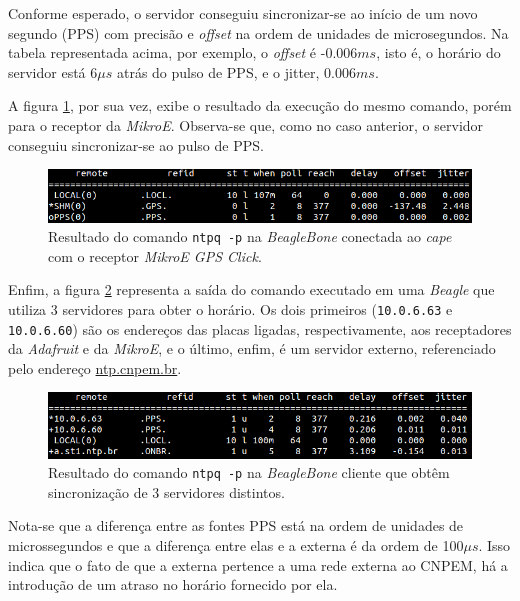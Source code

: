 \FloatBarrier

Conforme esperado, o servidor conseguiu sincronizar-se ao início de um novo
segundo (PPS) com precisão e \textit{offset} na ordem de unidades de
microsegundos. Na tabela representada acima, por exemplo, o \textit{offset} é
-0.006\(ms\), isto é, o horário do servidor está 6\(\mu s\) atrás do pulso de
PPS, e o jitter, 0.006\(ms\).

\vspace{12pt}

A figura \ref{img:mikroe}, por sua vez, exibe o resultado da execução do mesmo
comando, porém para o receptor da \textit{MikroE}. Observa-se que, como no caso
anterior, o servidor conseguiu sincronizar-se ao pulso de PPS.  

\FloatBarrier

\begin{figure}[h]
    
    \centering
    \includegraphics[scale=0.6]{image/mikroe}
    \caption {\centering Resultado do comando \texttt{ntpq -p} na
    \textit{BeagleBone} conectada ao \textit{cape} com o receptor
    \textit{MikroE GPS Click}.}
    \label{img:mikroe} 
\end{figure} 

\FloatBarrier

Enfim, a figura \ref{img:cliente_ntp} representa a saída do comando executado em
uma \textit{Beagle} que utiliza 3 servidores para obter o horário. Os dois
primeiros (\texttt{10.0.6.63} e \texttt{10.0.6.60}) são os
endereços das placas ligadas, respectivamente, aos receptadores da
\textit{Adafruit} e da \textit{MikroE}, e o último, enfim, é um servidor
externo, referenciado pelo endereço \url{ntp.cnpem.br}. 

\FloatBarrier

\begin{figure}[h]
    
    \centering
    \includegraphics[scale=0.6]{image/cliente-ntp}
    \caption {\centering Resultado do comando \texttt{ntpq -p} na
    \textit{BeagleBone} cliente que obtêm sincronização de 3 servidores
    distintos.}
    \label{img:cliente_ntp} 
\end{figure} 

\FloatBarrier

Nota-se que a diferença
entre as fontes PPS está na ordem de unidades de microssegundos e que a
diferença entre elas e a externa é da ordem de 100\(\mu s\). Isso indica que o
fato de que a externa pertence a uma rede externa ao CNPEM, há a introdução de
um atraso no horário fornecido por ela.
